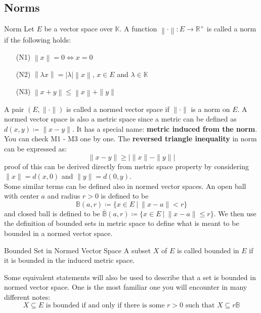 \documentclass{article}
\begin{document}
\subsection{Norms}
\begin{defin}{Norm}
    Let $E$ be a vector space over $\mathbb{K}$. A function $\left \| \cdot \right \| : E \to \mathbb{R}^+$ is called a norm if the following holds:
    \begin{itemize}
        \item[(N1)] $\left \| x \right \|  = 0 \Longleftrightarrow x = 0$ 
        \item[(N2)] $\left \| \lambda x \right \| = |\lambda| \left \| x \right \|$, $x \in E$ and $\lambda \in \mathbb{K}$ 
        \item[(N3)] $\left \| x + y \right \| \leq \left \| x \right \| + \|y\| $
    \end{itemize}
\end{defin}
A pair $(E, \| \cdot \|)$ is called a normed vector space if $\| \cdot \|$ is a norm on $E$. A normed vector space is also a metric space since a metric can be defined as 
$d(x, y) \coloneq \|x - y\|$. It has a special name: \textbf{metric induced from the norm}. You can check M1 - M3 one by one. The \textbf{reversed triangle inequality} in norm can be expressed as:
$$
\| x - y \| \geq | \| x \| - \|y\| |
$$
proof of this can be derived directly from metric space property by considering $\| x \| = d(x, 0)$ and $\| y \| = d(0, y)$.\\
Some similar terms can be defined also in normed vector spaces. An open ball with center $a$ and radius $r > 0$ is defined to be 
$$
\mathbb{B}(a,r) \coloneq \{x \in E\ |\ \|x - a\| < r\}
$$ 
and closed ball is defined to be $\bar{\mathbb{B}}(a,r) \coloneq \{x \in E\ |\ \|x - a\| \leq r\}$. We then use the definition of bounded sets in metric space to define what is meant 
to be bounded in a normed vector space. 
\begin{defin}{Bounded Set in Normed Vector Space}
    A subset $X$ of $E$ is called bounded in $E$ if it is bounded in the induced metric space.
\end{defin}
Some equivalent statements will also be used to describe that a set is bounded in normed vector space. One is the most familiar one you will encounter in 
many different notes:
$$
X \subseteq E \text{ is bounded if and only if there is some } r > 0 \text{ such that } X \subseteq r\mathbb{B}
$$
\end{document}
